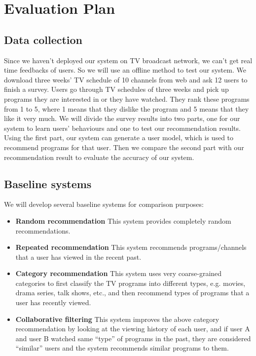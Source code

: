 \section{Evaluation Plan}
\label{sec:eval}

\subsection{Data collection}
Since we haven't deployed our system on TV broadcast network, we can't get
real time feedbacks of users. So we will use an offline method to test our system.
We download three weeks' TV schedule of 10 channels from web and ask 12 users to finish a
survey. Users go through TV schedules of three weeks
and pick up programs they are interested in or they have watched. They rank
these programs from 1 to 5, where 1 means that they dislike the program
and 5 means that they like it very much.
We will divide the survey results into two parts, one for our system to learn users'
behaviours and one to test our recommendation results. Using the first part,
our system can generate a user model, which is used to recommend programs for
that user. Then we compare the second part with our recommendation result to
evaluate the accuracy of our system.

\subsection{Baseline systems}
We will develop several baseline systems for comparison purposes:
\begin{itemize}
\item \textbf{Random recommendation} This system provides completely random recommendations.
\item \textbf{Repeated recommendation} This system recommends programs/channels that a user has viewed in the recent past.
\item \textbf{Category recommendation} This system uses very coarse-grained categories to first classify the TV programs into different types, e.g. movies, drama series, talk shows,
etc., and then recommend types of programs that a user has recently viewed.
\item \textbf{Collaborative filtering} This system improves the above category recommendation by looking at the viewing history of each user, and if user A and user B watched same
``type'' of programs in the past, they are considered ``similar'' users and
the system recommends similar programs to them.
\end{itemize}

